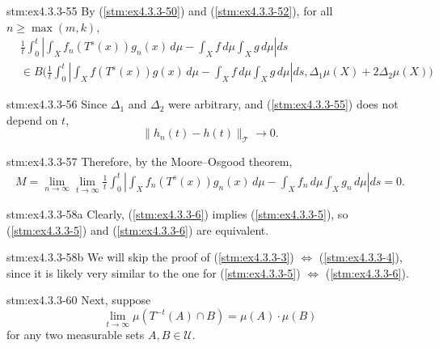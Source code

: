 \begin{statement}{stm:ex4.3.3-55}
By (\ref{stm:ex4.3.3-50}) and (\ref{stm:ex4.3.3-52}), for all $n \geq \max(m,k)$,
\begin{align*}
&\frac{1}{t} \int_0^t \left| \int_X f_n(T^s(x)) g_n(x) \, d\mu 
- \int_X f \, d\mu \int_X g \, d\mu \right| ds \\
&\in B \Big( \frac{1}{t} \int_0^t \left| \int_X f(T^s(x)) g(x) \, d\mu 
- \int_X f \, d\mu \int_X g \, d\mu \right| ds, \Delta_1 \mu(X) + 2 \Delta_2 \mu(X) \Big)
\end{align*}
\end{statement}

\begin{statement}{stm:ex4.3.3-56}
Since $\Delta_1$ and $\Delta_2$ were arbitrary, and (\ref{stm:ex4.3.3-55}) does not depend on $t$, 
\[
\| h_n(t) - h(t) \|_{\mathcal{T}} \to 0.
\]
\end{statement}

\begin{statement}{stm:ex4.3.3-57}
Therefore, by the Moore–Osgood theorem,
\begin{align*}
M
= \lim_{n \to \infty} \lim_{t \to \infty} \frac{1}{t} \int_0^t 
\left| \int_X f_n(T^s(x)) g_n(x) \, d\mu 
- \int_X f_n \, d\mu \int_X g_n \, d\mu \right| ds = 0.
\end{align*}
\end{statement}

\begin{statement}{stm:ex4.3.3-58a}
Clearly, (\ref{stm:ex4.3.3-6}) implies (\ref{stm:ex4.3.3-5}), so (\ref{stm:ex4.3.3-5}) and (\ref{stm:ex4.3.3-6}) are equivalent.
\end{statement}

\begin{statement}{stm:ex4.3.3-58b}
We will skip the proof of (\ref{stm:ex4.3.3-3}) $\Leftrightarrow$ (\ref{stm:ex4.3.3-4}), since it is likely very similar to the one for (\ref{stm:ex4.3.3-5}) $\Leftrightarrow$ (\ref{stm:ex4.3.3-6}). 
\end{statement}

\begin{statement}{stm:ex4.3.3-60}
Next, suppose 
\[
\lim_{t \to \infty} \mu(T^{-t}(A) \cap B) = \mu(A) \cdot \mu(B)
\]
for any two measurable sets $A, B \in \mathcal{U}$.
\end{statement}


